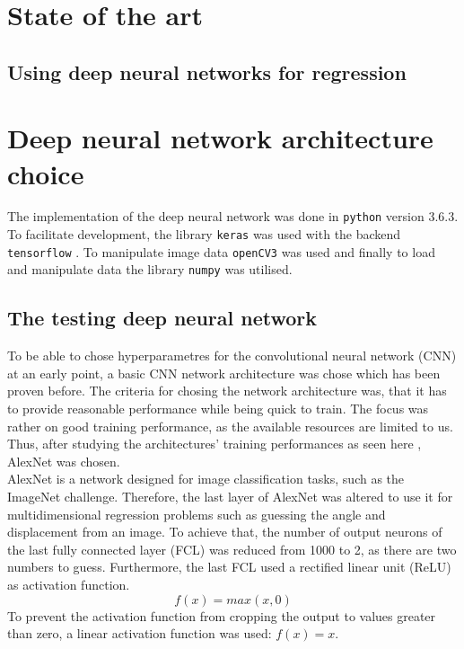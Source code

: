 \documentclass[10pt,a4paper,twoside,journal]{IEEEtran}
\begin{document}

\section{State of the art}
\label{sc:sota}
\the\textwidth
\the\columnwidth

\subsection{Using deep neural networks for regression}

\section{Deep neural network architecture choice}
The implementation of the deep neural network was done in \texttt{python} version 3.6.3. To facilitate development, the library \texttt{keras} \cite{chollet2015keras} was used with the backend \texttt{tensorflow} \cite{tensorflow2015-whitepaper}. To manipulate image data \texttt{openCV3} \cite{opencv_library} was used and finally to load and manipulate data the library \texttt{numpy} \cite{5725236} was utilised. 
\subsection{The testing deep neural network}
\label{ssc:testing-dnn}
To be able to chose hyperparametres for the convolutional neural network (CNN) at an early point, a basic CNN network architecture was chose which has been proven before. The criteria for chosing the network architecture was, that it has to provide reasonable performance while being quick to train. The focus was rather on good training performance, as the available resources are limited to us. Thus, after studying the architectures' training performances as seen here \cite{jjohnson-cnn-benchmarks}, AlexNet \cite{alexnet2012imagenet} was chosen.\\

AlexNet is a network designed for image classification tasks, such as the ImageNet challenge. Therefore, the last layer of AlexNet was altered to use it for multidimensional regression problems such as guessing the angle and displacement from an image. To achieve that, the number of output neurons of the last fully connected layer (FCL) was reduced from 1000 to 2, as there are two numbers to guess. Furthermore, the last FCL used a rectified linear unit (ReLU) as activation function. 
\begin{equation}
	f(x) = max(x, 0)
\end{equation}
To prevent the activation function from cropping the output to values greater than zero, a linear activation function was used: $ f(x) = x $.
\end{document}
